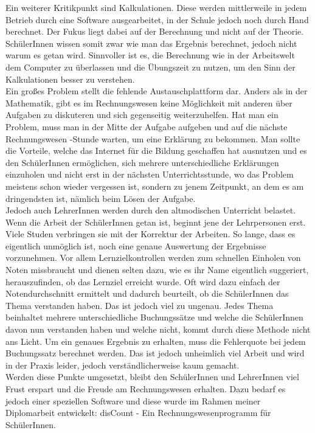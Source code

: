 \documentclass[12pt]{report}
\begin{document}
\noindent Ein weiterer Kritikpunkt sind Kalkulationen. Diese werden mittlerweile in jedem Betrieb durch eine Software ausgearbeitet, in der Schule jedoch noch durch Hand berechnet. Der Fukus liegt dabei auf der Berechnung und nicht auf der Theorie. SchülerInnen wissen somit zwar wie man das Ergebnis berechnet, jedoch nicht warum es getan wird. Sinnvoller ist es, die Berechnung wie in der Arbeitswelt dem Computer zu überlassen und die Übungszeit zu nutzen, um den Sinn der Kalkulationen besser zu verstehen.\\

\noindent Ein großes Problem stellt die fehlende Austauschplattform dar. Anders als in der Mathematik, gibt es im Rechnungswesen keine Möglichkeit mit anderen über Aufgaben zu diskuteren und sich gegenseitig weiterzuhelfen. Hat man ein Problem, muss man in der Mitte der Aufgabe aufgeben und auf die nächste Rechnungswesen -Stunde warten, um eine Erklärung zu bekommen. Man sollte die Vorteile, welche das Internet für die Bildung geschaffen hat ausnutzen und es den SchülerInnen ermöglichen, sich mehrere unterschiedliche Erklärungen einzuholen und nicht erst in der nächsten Unterrichtsstunde, wo das Problem meistens schon wieder vergessen ist, sondern zu jenem Zeitpunkt, an dem es am dringendsten ist, nämlich beim Lösen der Aufgabe.\\

\noindent Jedoch auch LehrerInnen werden durch den altmodischen Unterricht belastet. Wenn die Arbeit der SchülerInnen getan ist, beginnt jene der Lehrpersonen erst. Viele Studen verbringen sie mit der Korrektur der Arbeiten. So lange, dass es eigentlich unmöglich ist, noch eine genaue Auswertung der Ergebnisse vorzunehmen. Vor allem Lernzielkontrollen werden zum schnellen Einholen von Noten missbraucht und dienen selten dazu, wie es ihr Name eigentlich suggeriert, herauszufinden, ob das Lernziel erreicht wurde. Oft wird dazu einfach der Notendurchschnitt ermittelt und dadurch beurteilt, ob die SchülerInnen das Thema verstanden haben. Das ist jedoch viel zu ungenau. Jedes Thema beinhaltet mehrere unterschiedliche Buchungssätze und welche die SchülerInnen davon nun verstanden haben und welche nicht, kommt durch diese Methode nicht ans Licht. Um ein genaues Ergebnis zu erhalten, muss die Fehlerquote bei jedem Buchungssatz berechnet werden. Das ist jedoch unheimlich viel Arbeit und wird in der Praxis leider, jedoch verständlicherweise kaum gemacht.\\

\noindent Werden diese Punkte umgesetzt, bleibt den SchülerInnen und LehrerInnen viel Frust erspart und die Freude am Rechnungswesen erhalten. Dazu bedarf es jedoch einer speziellen Software und diese wurde im Rahmen meiner Diplomarbeit entwickelt: disCount - Ein Rechnungswesenprogramm für SchülerInnen.
  
\end{document}
